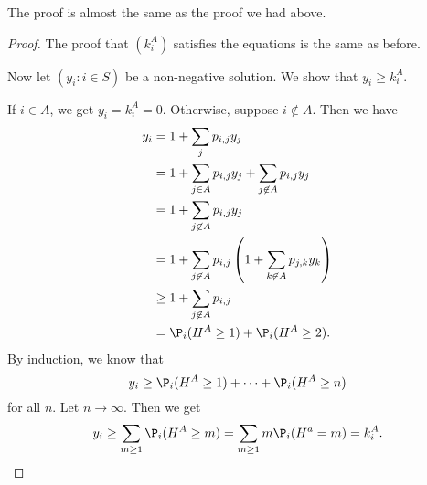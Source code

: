 \documentclass[a4paper]{article}
\begin{document}
The proof is almost the same as the proof we had above.
\begin{proof}
  The proof that $(k_i^A)$ satisfies the equations is the same as before.

  Now let $(y_i : i\in S)$ be a non-negative solution. We show that $y_i \geq k_i^A$.

  If $i \in A$, we get $y_i = k_i^A = 0$. Otherwise, suppose $i\not\in A$. Then we have
  \begin{align*}
    y_i &= 1 + \sum_j p_{i, j}y_j\\
    &= 1 + \sum_{j \in A}p_{i, j}y_j + \sum_{j\not\in A}p_{i, j}y_j\\
    &= 1 + \sum_{j\not\in A}p_{i, j}y_j\\
    &= 1 + \sum_{j \not\in A}p_{i, j}\left(1 + \sum_{k\not\in A} p_{j, k}y_k\right)\\
    &\geq 1 + \sum_{j \not\in A} p_{i, j}\\
    &= \P_i(H^A \geq 1) + \P_i(H^A \geq 2).
  \end{align*}
  By induction, we know that
  \[
    y_i \geq \P_i (H^A \geq 1) + \cdots + \P_i(H^A \geq n)
  \]
  for all $n$. Let $n\to \infty$. Then we get
  \[
    y_i \geq \sum_{m \geq 1}\P_i(H^A \geq m) = \sum_{m \geq 1} m\P_i(H^a = m)= k_i^A.
  \]
\end{proof}
\end{document}
